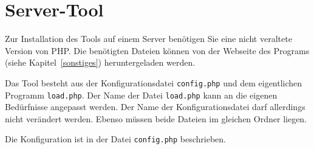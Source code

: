 


\section{Server-Tool}\label{upload:server}
Zur Installation des Tools auf einem Server benötigen Sie eine nicht veraltete Version von PHP.
Die benötigten Dateien können von der Webseite des Programs (siehe Kapitel~\ref{sonstiges}) heruntergeladen werden.

Das Tool besteht aus der Konfigurationsdatei \texttt{config.php} und dem eigentlichen Programm \texttt{load.php}.
Der Name der Datei \texttt{load.php} kann an die eigenen Bedürfnisse angepasst werden.
Der Name der Konfigurationsdatei darf allerdings nicht verändert werden.
Ebenso müssen beide Dateien im gleichen Ordner liegen.

Die Konfiguration ist in der Datei \texttt{config.php} beschrieben.
